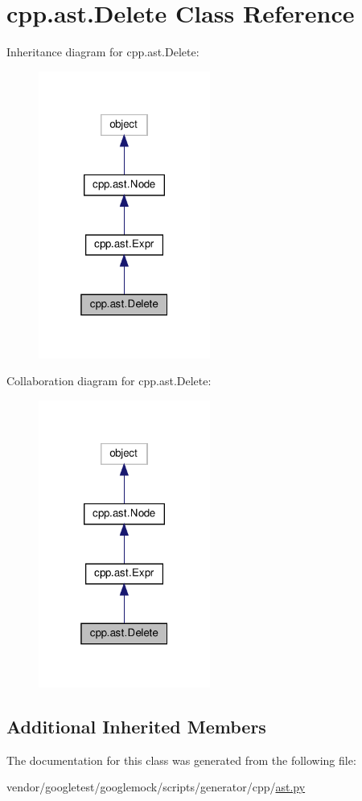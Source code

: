 \hypertarget{classcpp_1_1ast_1_1_delete}{}\section{cpp.\+ast.\+Delete Class Reference}
\label{classcpp_1_1ast_1_1_delete}


Inheritance diagram for cpp.\+ast.\+Delete\+:
\nopagebreak
\begin{figure}[H]
\begin{center}
\leavevmode
\includegraphics[width=160pt]{classcpp_1_1ast_1_1_delete__inherit__graph}
\end{center}
\end{figure}


Collaboration diagram for cpp.\+ast.\+Delete\+:
\nopagebreak
\begin{figure}[H]
\begin{center}
\leavevmode
\includegraphics[width=160pt]{classcpp_1_1ast_1_1_delete__coll__graph}
\end{center}
\end{figure}
\subsection*{Additional Inherited Members}


The documentation for this class was generated from the following file\+:\begin{DoxyCompactItemize}
\item 
vendor/googletest/googlemock/scripts/generator/cpp/\hyperlink{ast_8py}{ast.\+py}\end{DoxyCompactItemize}
